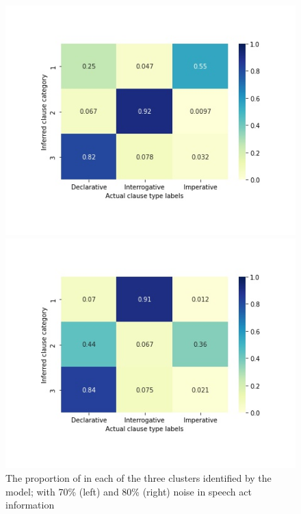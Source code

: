 \begin{figure}[H]
\begin{minipage}[b]{0.45\linewidth}	
    \centering
    \includegraphics[width=1.2\textwidth]{figures/target-heatmap-70.jpg}
\end{minipage}
\begin{minipage}[b]{0.45\linewidth}	
\centering
    \includegraphics[width=1.2\textwidth]{figures/target-heatmap-80.jpg}
\end{minipage}
    \caption{The proportion of \diis{} in each of the three clusters identified by the \plearnerabbr{} model; with 70\% (left) and 80\% (right) noise in speech act information }
    \label{fig:noisy80-heatmap}
\end{figure}

